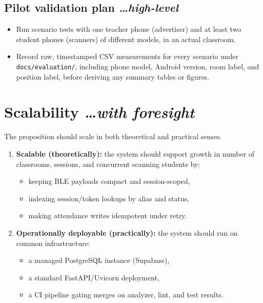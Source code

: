 \documentclass[11pt,a4paper]{article}
\newcommand{\BvrHint}[1]{%
  {\normalfont\normalsize\itshape\hfill #1}}
\begin{document}
\subsection{Pilot validation plan %
\BvrHint{\ldots high-level}}
\begin{itemize}[leftmargin=0.7cm]
    \item Run scenario tests with one teacher phone (advertiser) and at
    least two student phones (scanners) of different models, in an actual
    classroom.
    \item Record raw, timestamped CSV measurements for every scenario
    under \texttt{docs/evaluation/}, including phone model, Android
    version, room label, and position label, before deriving any summary
    tables or figures.
\end{itemize}

\section{Scalability %
\BvrHint{\ldots with foresight}}
The proposition should scale in both theoretical and practical senses.

\begin{enumerate}[leftmargin=0.7cm]
    \item \textbf{Scalable (theoretically):} the system should support
    growth in number of classrooms, sessions, and concurrent scanning
    students by:
    \begin{itemize}[leftmargin=0.7cm]
        \item keeping BLE payloads compact and session-scoped,
        \item indexing session/token lookups by alias and status,
        \item making attendance writes idempotent under retry.
    \end{itemize}

    \item \textbf{Operationally deployable (practically):} the system
    should run on common infrastructure:
    \begin{itemize}[leftmargin=0.7cm]
        \item a managed PostgreSQL instance (Supabase),
        \item a standard FastAPI/Uvicorn deployment,
        \item a CI pipeline gating merges on analyzer, lint, and test
        results.
    \end{itemize}
\end{enumerate}
\end{document}
